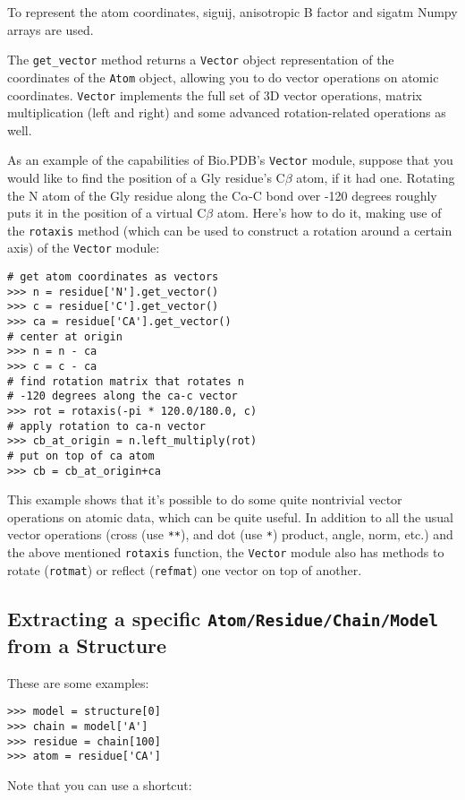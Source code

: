 To represent the atom coordinates, siguij, anisotropic B factor and sigatm Numpy
arrays are used.

The \texttt{get\_vector} method returns a \texttt{Vector} object representation of the coordinates of the \texttt{Atom} object, allowing you to do vector operations on atomic coordinates. \texttt{Vector} implements the full set of 3D vector operations, matrix multiplication (left and right) and some advanced rotation-related operations as well.

As an example of the capabilities of Bio.PDB's \texttt{Vector} module,
suppose that you would like to find the position of a Gly residue's C$\beta$
atom, if it had one. Rotating the N atom of
the Gly residue along the C$\alpha$-C bond over -120 degrees roughly
puts it in the position of a virtual C$\beta$ atom. Here's how to
do it, making use of the \texttt{rotaxis} method (which can be used
to construct a rotation around a certain axis) of the \texttt{Vector}
module:

\begin{verbatim}
# get atom coordinates as vectors
>>> n = residue['N'].get_vector()
>>> c = residue['C'].get_vector()
>>> ca = residue['CA'].get_vector()
# center at origin
>>> n = n - ca
>>> c = c - ca
# find rotation matrix that rotates n
# -120 degrees along the ca-c vector
>>> rot = rotaxis(-pi * 120.0/180.0, c)
# apply rotation to ca-n vector
>>> cb_at_origin = n.left_multiply(rot)
# put on top of ca atom
>>> cb = cb_at_origin+ca
\end{verbatim}
This example shows that it's possible to do some quite nontrivial
vector operations on atomic data, which can be quite useful. In addition
to all the usual vector operations (cross (use \texttt{{*}{*}}), and
dot (use \texttt{{*}}) product, angle, norm, etc.) and the above mentioned
\texttt{rotaxis} function, the \texttt{Vector} module also has methods
to rotate (\texttt{rotmat}) or reflect (\texttt{refmat}) one vector
on top of another.

\subsection{Extracting a specific \texttt{Atom/\-Residue/\-Chain/\-Model}
from a Structure}

These are some examples:

\begin{verbatim}
>>> model = structure[0]
>>> chain = model['A']
>>> residue = chain[100]
>>> atom = residue['CA']
\end{verbatim}
Note that you can use a shortcut:

